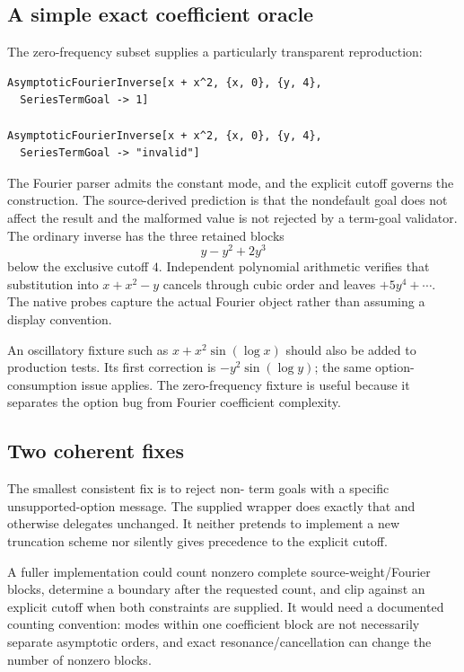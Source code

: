 \documentclass[11pt,a4paper]{article}
\newcommand{\code}[1]{\texttt{\detokenize{#1}}}
\begin{document}
\subsection{A simple exact coefficient oracle}

The zero-frequency subset supplies a particularly transparent reproduction:
\begin{lstlisting}
AsymptoticFourierInverse[x + x^2, {x, 0}, {y, 4},
  SeriesTermGoal -> 1]

AsymptoticFourierInverse[x + x^2, {x, 0}, {y, 4},
  SeriesTermGoal -> "invalid"]
\end{lstlisting}
The Fourier parser admits the constant mode, and the explicit cutoff governs the construction. The source-derived prediction is that the nondefault goal does not affect the result and the malformed value is not rejected by a term-goal validator. The ordinary inverse has the three retained blocks
\[
 y-y^2+2y^3
\]
below the exclusive cutoff $4$. Independent polynomial arithmetic verifies that substitution into $x+x^2-y$ cancels through cubic order and leaves $+5y^4+\cdots$. The native probes capture the actual Fourier object rather than assuming a display convention.

An oscillatory fixture such as $x+x^2\sin(\log x)$ should also be added to production tests. Its first correction is $-y^2\sin(\log y)$; the same option-consumption issue applies. The zero-frequency fixture is useful because it separates the option bug from Fourier coefficient complexity.

\subsection{Two coherent fixes}

The smallest consistent fix is to reject non-\code{Automatic} term goals with a specific unsupported-option message. The supplied \code{CheckedFourierInverse} wrapper does exactly that and otherwise delegates unchanged. It neither pretends to implement a new truncation scheme nor silently gives precedence to the explicit cutoff.

A fuller implementation could count nonzero complete source-weight/Fourier blocks, determine a boundary after the requested count, and clip against an explicit cutoff when both constraints are supplied. It would need a documented counting convention: modes within one coefficient block are not necessarily separate asymptotic orders, and exact resonance/cancellation can change the number of nonzero blocks.
\end{document}
